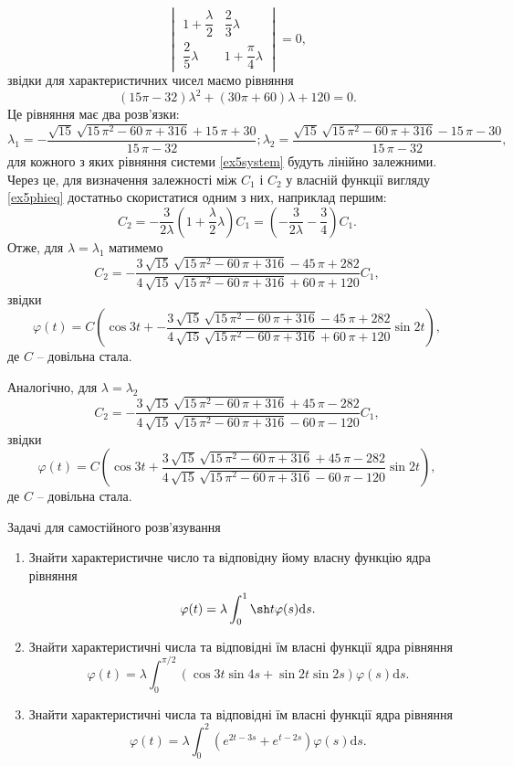 \documentclass[14pt,twoside]{extreport}
\theoremstyle{mystyle}
\newcommand{\problems}{\bigskip\noindent\fbox{\HandPencilLeft}\hspace{6pt}\textsf{Задачі
		для самостійного розв'язування}}
\numberwithin{equation}{chapter}
\begin{document}
\begin{small}
\[\begin{vmatrix}
1+\dfrac{\lambda}{2} & \dfrac{2}{3} \lambda\\
\dfrac{2}{5} \lambda & 1+\dfrac{\pi}{4}\lambda
\end{vmatrix}
=0,
\]
звідки для характеристичних чисел маємо рівняння
\[
(15\pi-32)\lambda^2 + (30\pi+60) \lambda + 120=0.
\]
Це рівняння має два розв'язки:
\[
\lambda_1= -\frac{\sqrt{15}\,\sqrt{15\,{\pi }^{2}-60\,\pi +316}+15\,\pi +30}{15\,\pi -32}; \lambda_2 = \frac{\sqrt{15}\,\sqrt{15\,{\pi }^{2}-60\,\pi +316}-15\,\pi -30}{15\,\pi -32},
\]
для кожного з яких рівняння системи \eqref{ex5system} будуть лінійно залежними. Через це, для визначення залежності між $C_1$ і $C_2$ у власній функції вигляду \eqref{ex5phieq} достатньо скористатися одним з них, наприклад першим:
\[
C_2 = -\dfrac{3}{2\lambda} \left(1+\dfrac{\lambda}{2}\lambda\right)C_1= \left(-\dfrac{3}{2\lambda}-\dfrac{3}{4}\right)C_1.
\]
Отже, для $\lambda = \lambda_1$ матимемо
\[
C_2 = -\frac{3\,\sqrt{15}\,\sqrt{15\,{\pi }^{2}-60\,\pi +316}-45\,\pi +282}{4\,\sqrt{15}\,\sqrt{15\,{\pi }^{2}-60\,\pi +316}+60\,\pi +120}C_1,
\]
звідки
\[
\varphi(t) = C \left(\cos 3t + -\frac{3\,\sqrt{15}\,\sqrt{15\,{\pi }^{2}-60\,\pi +316}-45\,\pi +282}{4\,\sqrt{15}\,\sqrt{15\,{\pi }^{2}-60\,\pi +316}+60\,\pi +120} \sin 2t\right),
\]
де $C$ -- довільна стала.

Аналогічно, для $\lambda = \lambda_2$
\[
C_2 = -\frac{3\,\sqrt{15}\,\sqrt{15\,{\pi }^{2}-60\,\pi +316}+45\,\pi -282}{4\,\sqrt{15}\,\sqrt{15\,{\pi }^{2}-60\,\pi +316}-60\,\pi -120}C_1,
\]
звідки
\[
\varphi(t) = C \left(\cos 3t + \frac{3\,\sqrt{15}\,\sqrt{15\,{\pi }^{2}-60\,\pi +316}+45\,\pi -282}{4\,\sqrt{15}\,\sqrt{15\,{\pi }^{2}-60\,\pi +316}-60\,\pi -120} \sin 2t\right),
\]
де $C$ -- довільна стала.

\problems
\begin{enumerate}
	\item Знайти характеристичне число та відповідну йому власну функцію ядра рівняння
	\[
	\varphi(t) = \lambda \int_{0}^{1} \sh t \varphi(s) \mathrm{d}s.
	\]
	\item Знайти характеристичні числа та відповідні їм власні функції ядра рівняння
	\[
	\varphi(t) = \lambda \int_{0}^{\pi/2} \left(\cos 3t \sin 4s + \sin 2t \sin 2s\right) \varphi(s) \mathrm{d}s.
	\]
	\item Знайти характеристичні числа та відповідні їм власні функції ядра рівняння
	\[
	\varphi(t) = \lambda \int_{0}^{2} \left(e^{2t-3s} + e^{t-2s}\right) \varphi(s) \mathrm{d}s.
	\]
\end{enumerate} 

\end{small}
\end{document}
